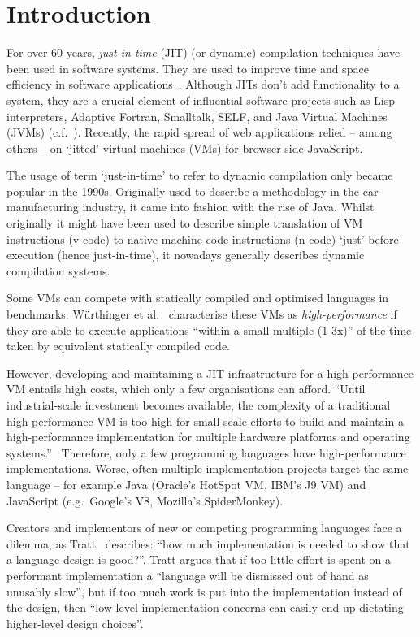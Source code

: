 
\section{Introduction}

For over 60 years, \emph{just-in-time} (JIT) (or dynamic) compilation techniques
have been used in software systems. They are used to improve time and space
efficiency in software applications~\cite{aycock2003brief}. Although JITs don't
add functionality to a system, they are a crucial element of influential
software projects such as Lisp interpreters, Adaptive Fortran, Smalltalk, SELF,
and Java Virtual Machines (JVMs) (c.f.~\cite{arnold2005survey}). Recently, the
rapid spread of web applications relied -- among others -- on `jitted'  virtual
machines (VMs) for browser-side JavaScript.

The usage of term `just-in-time' to refer to dynamic compilation only became
popular in the 1990s. Originally used to describe a methodology in the car
manufacturing industry, it came into fashion with the rise of Java. Whilst
originally it might have been used to describe simple translation of VM
instructions (v-code) to native machine-code instructions (n-code) `just' before
execution (hence just-in-time), it nowadays generally describes dynamic
compilation systems.

Some VMs can compete with statically compiled and optimised languages in
benchmarks. W\"urthinger et al.~\cite{wurthinger2013one} characterise these VMs
as \emph{high-performance} if they are able to execute applications ``within a
small multiple (1-3x)'' of the time taken by equivalent statically compiled
code.

However, developing and maintaining a JIT infrastructure for a high-performance
VM entails high costs, which only a few organisations can afford. ``Until
industrial-scale investment becomes available, the complexity of a traditional
high-performance VM is too high for small-scale efforts to build and maintain a
high-performance implementation for multiple hardware platforms and operating
systems.''~\cite{wurthinger2013one}
Therefore, only a few programming languages have high-performance
implementations. Worse, often multiple implementation projects target the same
language -- for example Java (Oracle's HotSpot VM, IBM's J9 VM) and JavaScript
(e.g.~Google's V8, Mozilla's SpiderMonkey).

Creators and implementors of new or competing programming languages face a
dilemma, as Tratt~\cite{tratt_fast_enough} describes: ``how much implementation
is needed to show that a language design is good?''. Tratt argues that if too
little effort is spent on a performant implementation a ``language will be
dismissed out of hand as unusably slow'', but if too much work is put into the
implementation instead of the design, then ``low-level implementation concerns
can easily end up dictating higher-level design choices''.

